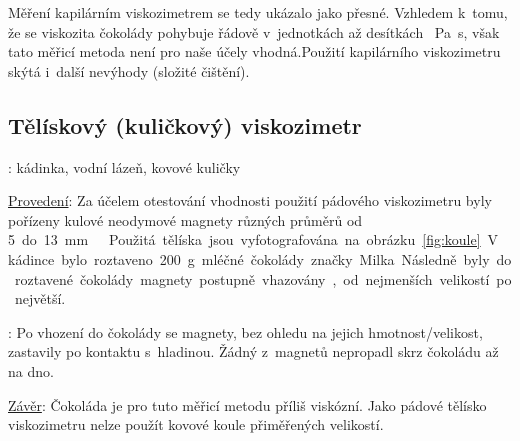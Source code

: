 \documentclass[12pt]{article}
\begin{document}
\par
Měření kapilárním viskozimetrem se tedy ukázalo jako přesné. Vzhledem k~tomu, že se viskozita čokolády pohybuje řádově v~jednotkách až desítkách \SI{}{\pascal\second}, však tato měřicí metoda není pro naše účely vhodná.\footnotemark\space Použití kapilárního viskozimetru skýtá i~další nevýhody (složité čištění).

\subsection{Tělískový (kuličkový) viskozimetr}%

\noindent \underline{}: kádinka, vodní lázeň, kovové kuličky
\par
\noindent \underline{Provedení}: Za účelem otestování vhodnosti použití pádového viskozimetru byly pořízeny kulové neodymové magnety různých průměrů od \SI{5} do \SI{13}{\milli\metre}.\footnotemark\space Použitá tělíska jsou vyfotografována na obrázku \ref{fig:koule}. V~kádince bylo roztaveno \SI{200}{\gram} mléčné čokolády značky Milka. Následně byly do roztavené čokolády magnety postupně vhazovány, od nejmenších velikostí po největší.
\par
\underline{}: Po vhození do čokolády se magnety, bez ohledu na jejich hmotnost/velikost, zastavily po kontaktu s~hladinou. Žádný z~magnetů nepropadl skrz čokoládu až na dno.
\par
\underline{Závěr}: Čokoláda je pro tuto měřicí metodu příliš viskózní. Jako pádové tělísko viskozimetru nelze použít kovové koule přiměřených velikostí.
\end{document}
